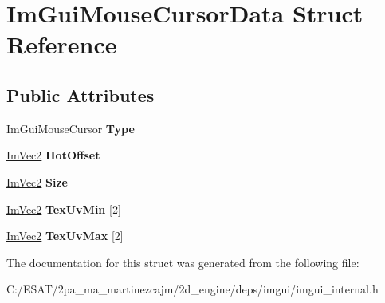 \hypertarget{struct_im_gui_mouse_cursor_data}{}\section{Im\+Gui\+Mouse\+Cursor\+Data Struct Reference}
\label{struct_im_gui_mouse_cursor_data}
\subsection*{Public Attributes}
\begin{DoxyCompactItemize}
\item 
\mbox{\label{struct_im_gui_mouse_cursor_data_ab58df812a8caf8741415053515b8f347}} 
Im\+Gui\+Mouse\+Cursor {\bfseries Type}
\item 
\mbox{\label{struct_im_gui_mouse_cursor_data_ae271e8ec495657c2231d6e47540d3b36}} 
\hyperlink{struct_im_vec2}{Im\+Vec2} {\bfseries Hot\+Offset}
\item 
\mbox{\label{struct_im_gui_mouse_cursor_data_af8dd3ec3de77811d6caf4bfdde085495}} 
\hyperlink{struct_im_vec2}{Im\+Vec2} {\bfseries Size}
\item 
\mbox{\label{struct_im_gui_mouse_cursor_data_add35adb991fcfd03ae33c3607aa0c842}} 
\hyperlink{struct_im_vec2}{Im\+Vec2} {\bfseries Tex\+Uv\+Min} \mbox{[}2\mbox{]}
\item 
\mbox{\label{struct_im_gui_mouse_cursor_data_a30bae90a9e61608c4fd9fe03b5f7390f}} 
\hyperlink{struct_im_vec2}{Im\+Vec2} {\bfseries Tex\+Uv\+Max} \mbox{[}2\mbox{]}
\end{DoxyCompactItemize}


The documentation for this struct was generated from the following file\+:\begin{DoxyCompactItemize}
\item 
C\+:/\+E\+S\+A\+T/2pa\+\_\+ma\+\_\+martinezcajm/2d\+\_\+engine/deps/imgui/imgui\+\_\+internal.\+h\end{DoxyCompactItemize}
